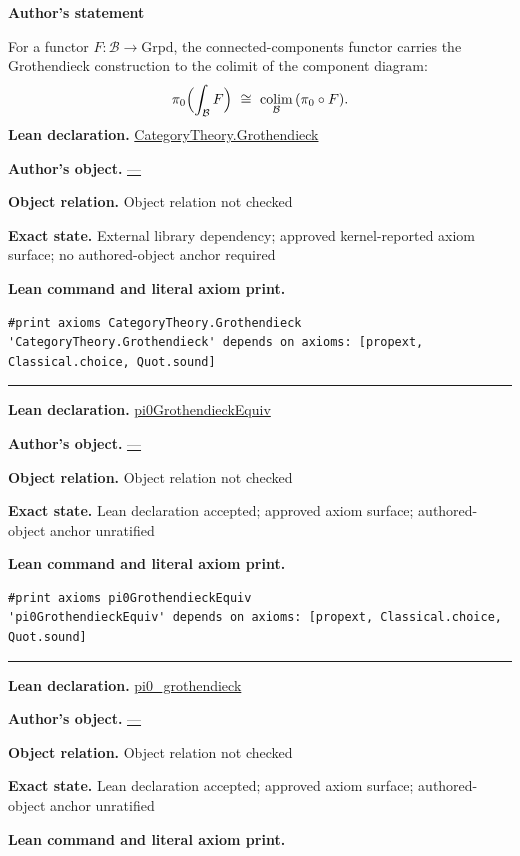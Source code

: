 \documentclass[11pt]{article}
\providecommand{\Grpd}{\mathrm{Grpd}}
\theoremstyle{plain}
\theoremstyle{definition}
\theoremstyle{remark}
\begin{document}
\begin{tcolorbox}[provenancecard,title={43. Lemma - \$\textbackslash{}pi\_0\$ of a Grothendieck construction},title after break={43. Lemma - \$\textbackslash{}pi\_0\$ of a Grothendieck construction (continued)}]
\textbf{Author's statement}\par
For a functor $F:\mathcal B\to\Grpd$, the connected-components functor carries the Grothendieck
construction to the colimit of the component diagram:
\[
  \pi_0\Bigl(\int_{\mathcal B}F\Bigr)\ \cong\ \operatorname*{colim}_{\mathcal B}\,(\pi_0\circ F).
\]
\tcblower
\textbf{Lean declaration.} \url{CategoryTheory.Grothendieck}
\par\textbf{Author's object.} \url{—}
\par\textbf{Object relation.} Object relation not checked
\par\textbf{Exact state.} External library dependency; approved kernel-reported axiom surface; no authored-object anchor required
\par\smallskip\textbf{Lean command and literal axiom print.}
\begin{Verbatim}[breaklines=true,breakanywhere=true,fontsize=\small]
#print axioms CategoryTheory.Grothendieck
'CategoryTheory.Grothendieck' depends on axioms: [propext, Classical.choice, Quot.sound]
\end{Verbatim}
\medskip\hrule\medskip
\textbf{Lean declaration.} \url{pi0GrothendieckEquiv}
\par\textbf{Author's object.} \url{—}
\par\textbf{Object relation.} Object relation not checked
\par\textbf{Exact state.} Lean declaration accepted; approved axiom surface; authored-object anchor unratified
\par\smallskip\textbf{Lean command and literal axiom print.}
\begin{Verbatim}[breaklines=true,breakanywhere=true,fontsize=\small]
#print axioms pi0GrothendieckEquiv
'pi0GrothendieckEquiv' depends on axioms: [propext, Classical.choice, Quot.sound]
\end{Verbatim}
\medskip\hrule\medskip
\textbf{Lean declaration.} \url{pi0_grothendieck}
\par\textbf{Author's object.} \url{—}
\par\textbf{Object relation.} Object relation not checked
\par\textbf{Exact state.} Lean declaration accepted; approved axiom surface; authored-object anchor unratified
\par\smallskip\textbf{Lean command and literal axiom print.}

\end{tcolorbox}
\end{document}
